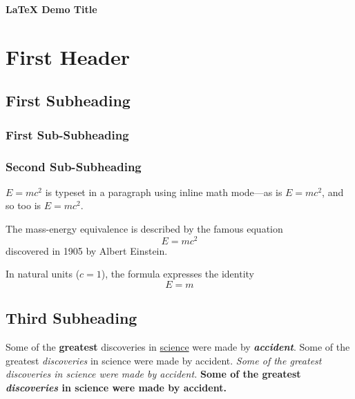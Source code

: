 \documentclass[12pt]{article}
\def\Title{\LaTeX{} Demo Title}
\begin{document}
  \thispagestyle{fancy} %
  \RaggedRight

  \vspace{1em}
  {\raggedright
  \textbf{\fontsize{18}{21}\selectfont \Title}\\
  \par}

\section{First Header}
\lipsum[1-2]

\subsection{First Subheading}
\lipsum[3-4]

\subsubsection{First Sub-Subheading}
\lipsum[5-6]

\subsubsection{Second Sub-Subheading}
\lipsum[5-6]

\begin{math}
E=mc^2
\end{math} is typeset in a paragraph using inline math mode---as is $E=mc^2$, and so too is \(E=mc^2\).

The mass-energy equivalence is described by the famous equation
\[ E=mc^2 \] discovered in 1905 by Albert Einstein. 

In natural units ($c = 1$), the formula expresses the identity
\begin{equation}
E=m
\end{equation}

\newpage %

\subsection{Third Subheading}
\lipsum[5-6]

Some of the \textbf{greatest} discoveries in \underline{science} were made by \textbf{\textit{accident}}.
Some of the greatest \emph{discoveries} in science were made by accident.
\textit{Some of the greatest \emph{discoveries} 
in science were made by accident.} 
\textbf{Some of the greatest \emph{discoveries} 
in science were made by accident.}
\end{document}
